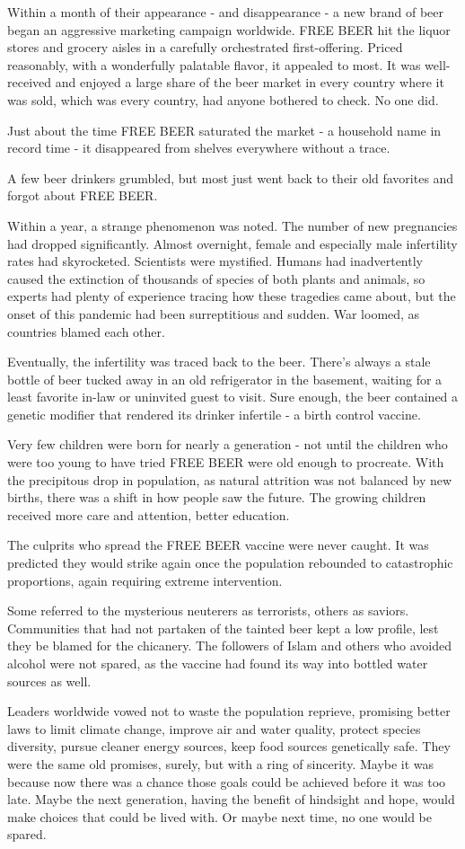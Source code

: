 Within a month of their appearance - and disappearance - a new brand of
beer began an aggressive marketing campaign worldwide. FREE BEER hit the
liquor stores and grocery aisles in a carefully orchestrated
first-offering. Priced reasonably, with a wonderfully palatable flavor,
it appealed to most. It was well-received and enjoyed a large share of
the beer market in every country where it was sold, which was every
country, had anyone bothered to check. No one did.

Just about the time FREE BEER saturated the market - a household name in
record time - it disappeared from shelves everywhere without a trace.

A few beer drinkers grumbled, but most just went back to their old
favorites and forgot about FREE BEER.

Within a year, a strange phenomenon was noted. The number of new
pregnancies had dropped significantly. Almost overnight, female and
especially male infertility rates had skyrocketed. Scientists were
mystified. Humans had inadvertently caused the extinction of thousands
of species of both plants and animals, so experts had plenty of
experience tracing how these tragedies came about, but the onset of this
pandemic had been surreptitious and sudden. War loomed, as countries
blamed each other.

Eventually, the infertility was traced back to the beer. There's always
a stale bottle of beer tucked away in an old refrigerator in the
basement, waiting for a least favorite in-law or uninvited guest to
visit. Sure enough, the beer contained a genetic modifier that rendered
its drinker infertile - a birth control vaccine.

Very few children were born for nearly a generation - not until the
children who were too young to have tried FREE BEER were old enough to
procreate. With the precipitous drop in population, as natural attrition
was not balanced by new births, there was a shift in how people saw the
future. The growing children received more care and attention, better
education.

The culprits who spread the FREE BEER vaccine were never caught. It was
predicted they would strike again once the population rebounded to
catastrophic proportions, again requiring extreme intervention.

Some referred to the mysterious neuterers as terrorists, others as
saviors. Communities that had not partaken of the tainted beer kept a
low profile, lest they be blamed for the chicanery. The followers of
Islam and others who avoided alcohol were not spared, as the vaccine had
found its way into bottled water sources as well.

Leaders worldwide vowed not to waste the population reprieve, promising
better laws to limit climate change, improve air and water quality,
protect species diversity, pursue cleaner energy sources, keep food
sources genetically safe. They were the same old promises, surely, but
with a ring of sincerity. Maybe it was because now there was a chance
those goals could be achieved before it was too late. Maybe the next
generation, having the benefit of hindsight and hope, would make choices
that could be lived with. Or maybe next time, no one would be spared.
